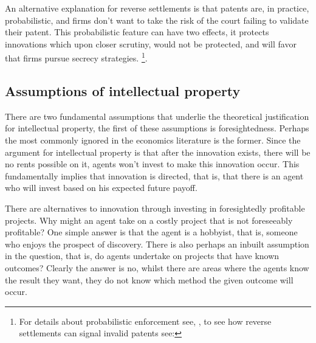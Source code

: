 \documentclass[12pt]{article}
\numberwithin{equation}{section}
\begin{document}

An alternative explanation for reverse settlements is that patents are, in practice, probabilistic, and firms don't want to take the risk of the court failing to validate their patent. This probabilistic feature can have two effects, it protects innovations which upon closer scrutiny, would not be protected, and will favor that firms pursue secrecy strategies. \footnote{For details about probabilistic enforcement see, \cite{Lemley2005}, to see how reverse settlements can signal invalid patents see:\cite{Dolin2011}}.




\subsection{Assumptions of intellectual property}


There are two fundamental assumptions that underlie the theoretical justification for intellectual property, the first of these assumptions is foresightedness. Perhaps the most commonly ignored in the economics literature is the former. Since the argument for intellectual property is that after the innovation exists, there will be no rents possible on it, agents won't invest to make this innovation occur. This fundamentally implies that innovation is directed, that is, that there is an agent who will invest based on his expected future payoff.

There are alternatives to innovation through investing in foresightedly profitable projects. Why might an agent take on a costly project that is not foreseeably profitable? One simple answer is that the agent is a hobbyist, that is, someone who enjoys the prospect of discovery. There is also perhaps an inbuilt assumption in the question, that is, do agents undertake on projects that have known outcomes? Clearly the answer is no, whilst there are areas where the agents know the result they want, they do not know which method the given outcome will occur.
\end{document}
